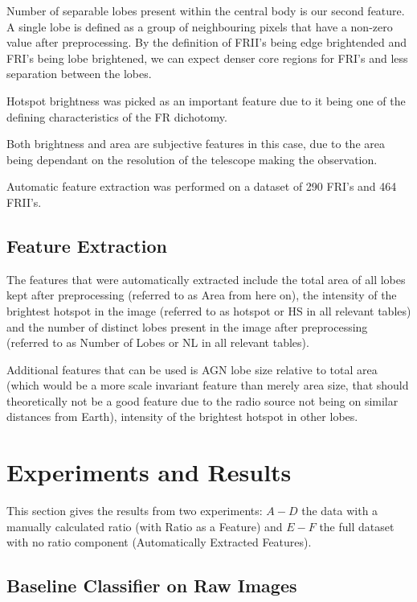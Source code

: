 \documentclass[conference]{IEEEtran}
\begin{document}
Number of separable lobes present within the central body is our second feature. A single lobe is defined as a group of neighbouring pixels that have a non-zero value after preprocessing. By the definition of FRII's being edge brightended and FRI's being lobe brightened, we can expect denser core regions for FRI's and less separation between the lobes.

Hotspot brightness was picked as an important feature due to it being one of the defining characteristics of the FR dichotomy.

Both brightness and area are subjective features in this case, due to the area being dependant on the resolution of the telescope making the observation.

Automatic feature extraction was performed on a dataset of 290 FRI's and 464 FRII's.

\subsection{Feature Extraction}

The features that were automatically extracted include the total area of all lobes kept after preprocessing (referred to as Area from here on), the intensity of the brightest hotspot in the image (referred to as hotspot or HS in all relevant tables) and the number of distinct lobes present in the image after preprocessing (referred to as Number of Lobes or NL in all relevant tables).

Additional features that can be used is AGN lobe size relative to total area (which would be a more scale invariant feature than merely area size, that should theoretically not be a good feature due to the radio source not being on similar distances from Earth), intensity of the brightest hotspot in other lobes.

\section{Experiments and Results}

This section gives the results from two experiments: $A-D$ the data with a manually calculated ratio (with Ratio as a Feature) and $E-F$ the full dataset with no ratio component (Automatically Extracted Features).

\subsection{Baseline Classifier on Raw Images}
\end{document}
